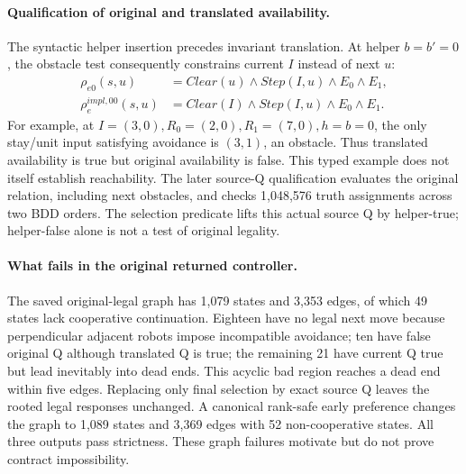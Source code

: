 \paragraph{Qualification of original and translated availability.}
The syntactic helper insertion precedes invariant translation. At
helper $b=b'=0$, the obstacle test consequently constrains current $I$
instead of next $u$:
\[
\begin{aligned}
 \rho_{e0}(s,u)&=Clear(u)\land Step(I,u)\land E_0\land E_1,\\
 \rho_e^{impl,00}(s,u)&=Clear(I)\land Step(I,u)\land E_0\land E_1.
\end{aligned}
\]
For example, at $I=(3,0),R_0=(2,0),R_1=(7,0),h=b=0$, the only
stay/unit input satisfying avoidance is $(3,1)$, an obstacle. Thus
translated availability is true but original availability is false.
This typed example does not itself establish reachability. The later
source-Q qualification evaluates the original relation, including next
obstacles, and checks 1,048,576 truth assignments across two BDD orders.
The selection predicate lifts this actual source Q by helper-true;
helper-false alone is not a test of original legality.

\paragraph{What fails in the original returned controller.}
The saved original-legal graph has 1,079 states and 3,353 edges, of which
49 states lack cooperative continuation. Eighteen have no legal next
move because perpendicular adjacent robots impose incompatible avoidance;
ten have false original Q although translated Q is true; the remaining
21 have current Q true but lead inevitably into dead ends. This acyclic
bad region reaches a dead end within five edges. Replacing only final
selection by exact source Q leaves the rooted legal responses unchanged.
A canonical rank-safe early preference changes the graph to 1,089 states
and 3,369 edges with 52 non-cooperative states. All three outputs pass
strictness. These graph failures motivate but do not prove contract
impossibility.

